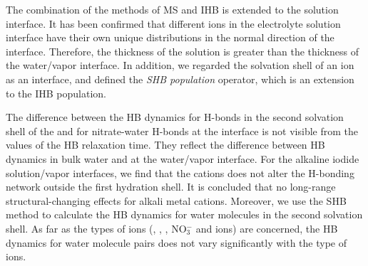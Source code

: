 The combination of the methods of MS and IHB is extended to the solution interface. 
It has been confirmed that different ions in the electrolyte solution interface have their own unique distributions in the normal direction of the interface. 
Therefore, the thickness of the solution is greater than the thickness of the water/vapor interface. 
In addition, we regarded the solvation shell of an ion as an interface, 
and defined the \emph{SHB population} operator, which is an extension to the IHB population.

The difference between the HB dynamics for H-bonds in the second solvation shell of the \Li and for nitrate-water H-bonds 
at the interface is not visible from the values of the HB relaxation time. They reflect the difference between HB dynamics in 
bulk water and at the water/vapor interface. For the alkaline iodide solution/vapor interfaces, we find 
that the cations does not alter the H-bonding network outside the first hydration shell. 
It is concluded that no long-range structural-changing effects for alkali metal cations.
Moreover, we use the SHB method to calculate the HB dynamics for water molecules in the second solvation shell.
As far as the types of ions (\Li, \Na, \K, NO$^-_3$ and \I ions) are concerned, 
the HB dynamics for water molecule pairs does not vary significantly with the type of ions.

